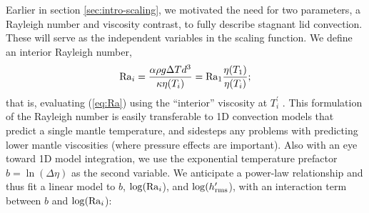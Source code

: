 
Earlier in section \ref{sec:intro-scaling}, we motivated the need for two parameters, a Rayleigh number and viscosity contrast, to fully describe stagnant lid convection. These will serve as the independent variables in the scaling function. %
We define an interior Rayleigh number,
\begin{equation}\label{eq:Ra_i}
    {\rm Ra}_i = \frac{\alpha\rho g \Delta T d^3}{\kappa \eta(T_i)} = {\rm Ra_1} \frac{\eta(T_1)}{\eta(T_i)};
\end{equation}
that is, evaluating (\ref{eq:Ra}) using the ``interior'' viscosity at $T_i^\prime$  \citep{solomatov_scaling_2000}. This formulation of the Rayleigh number is easily transferable to 1D convection models that predict a single mantle temperature, and sidesteps any problems with predicting lower mantle viscosities (where pressure effects are important). Also with an eye toward 1D model integration, we use the exponential temperature prefactor $b = \ln (\Delta \eta)$ as the second variable. We anticipate a power-law relationship and thus fit a linear model to $b$, $\log({\rm Ra}_i$), and $\log(h_{\rm rms}^\prime$), with an interaction term between $b$ and $\log({\rm Ra}_i$):
